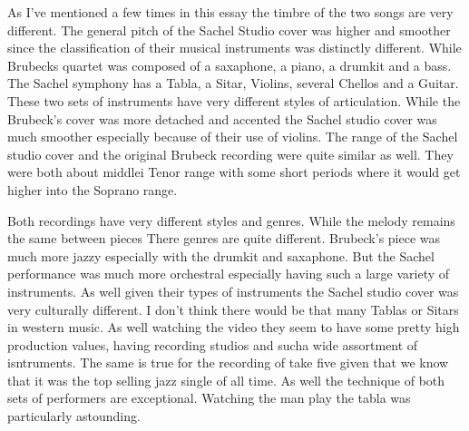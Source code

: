 \documentclass{article}
\begin{document}
As I've mentioned a few times in this essay the timbre of the two songs are very
different. The general pitch of the Sachel Studio cover was higher and smoother
since the classification of their musical instruments was distinctly different.
While Brubecks quartet was composed of a saxaphone, a piano, a drumkit and a
bass. The Sachel symphony has a Tabla, a Sitar, Violins, several Chellos and a
Guitar. These two sets of instruments have very different styles of
articulation. While the Brubeck's cover was more detached and accented the
Sachel studio cover was much smoother especially because of their use of
violins. The range of the Sachel studio cover and the original Brubeck recording
were quite similar as well. They were both about middlei Tenor range with some 
short periods where it would get higher into the Soprano range.

Both recordings have very different styles and genres. While the melody remains
the same between pieces There genres are quite different. Brubeck's piece was
much more jazzy especially with the drumkit and saxaphone. But the Sachel
performance was much more orchestral especially having such a large variety of
instruments. As well given their types of instruments the Sachel studio cover
was very culturally different. I don't think there would be that many Tablas or
Sitars in western music. As well watching the video they seem to have some
pretty high production values, having recording studios and sucha wide
assortment of isntruments. The same is true for the recording of take five given
that we know that it was the top selling jazz single of all time. As well the
technique of both sets of performers are exceptional. Watching the man play the
tabla was particularly astounding.
\end{document}
